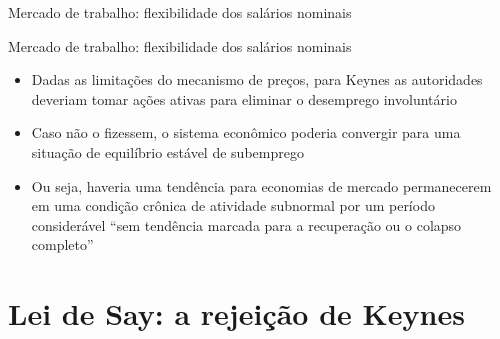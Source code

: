 \documentclass[10pt]{beamer}
\begin{document}
\begin{frame}{Mercado de trabalho: flexibilidade dos salários nominais}
\end{frame}

\begin{frame}{Mercado de trabalho: flexibilidade dos salários nominais}
    \begin{itemize}
        \item Dadas as limitações do mecanismo de preços, para Keynes as autoridades deveriam tomar ações ativas para eliminar o desemprego involuntário
        \bigskip
        \item Caso não o fizessem, o sistema econômico poderia convergir para uma situação de equilíbrio estável de subemprego
        \bigskip
        \item Ou seja, haveria uma tendência para economias de mercado permanecerem em uma condição crônica de atividade subnormal por um período considerável ``sem tendência marcada para a recuperação ou o colapso completo''
    \end{itemize}
\end{frame}

\section{Lei de Say: a rejeição de Keynes}
\end{document}
